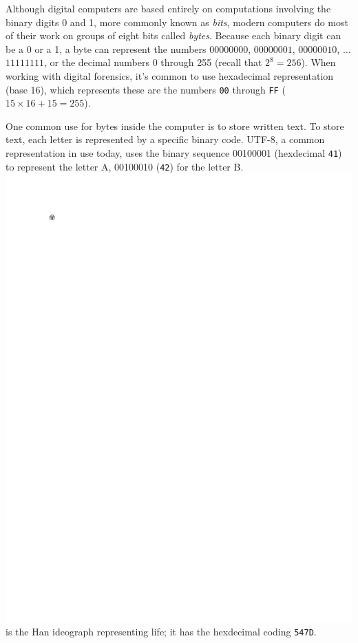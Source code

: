   Although digital computers are based entirely on computations
  involving the binary digits 0 and 1, more commonly known as
  \emph{bits}, modern computers do most of their work on groups of
  eight bits called \emph{bytes}. Because each binary digit can be a 0
  or a 1, a byte can represent the numbers $00000000$, $00000001$,
  $00000010$, $\ldots$ $11111111$, or the decimal numbers 0 through
  255 (recall that $2^8=256$). When working with digital forensics,
  it's common to use hexadecimal representation (base 16), which
  represents these are the numbers \texttt{00} through \texttt{FF}
  ($15\times16+15=255$).

  One common use for bytes inside the computer is to store written
  text. To store text, each letter is represented by a specific binary
  code. UTF-8, a common representation in use today, uses the
  binary sequence 00100001 (hexdecimal \texttt{41}) to represent the
  letter A, 00100010 (\texttt{42}) for the letter
  B. \includegraphics{uni/unicode_547d} is the Han ideograph
  representing life; it has the hexdecimal coding \texttt{547D}. 

